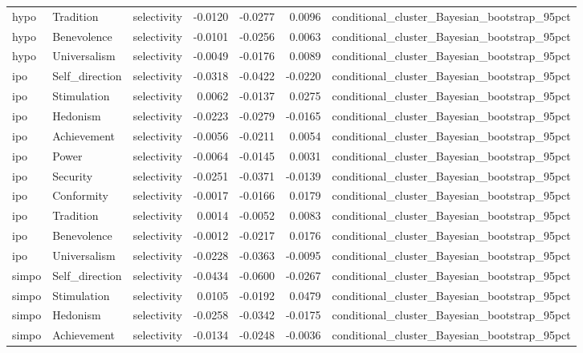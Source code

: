 \begin{tabular}{lllrrrl}
hypo & Tradition & selectivity & -0.0120 & -0.0277 & 0.0096 & conditional\_cluster\_Bayesian\_bootstrap\_95pct \\
hypo & Benevolence & selectivity & -0.0101 & -0.0256 & 0.0063 & conditional\_cluster\_Bayesian\_bootstrap\_95pct \\
hypo & Universalism & selectivity & -0.0049 & -0.0176 & 0.0089 & conditional\_cluster\_Bayesian\_bootstrap\_95pct \\
ipo & Self\_direction & selectivity & -0.0318 & -0.0422 & -0.0220 & conditional\_cluster\_Bayesian\_bootstrap\_95pct \\
ipo & Stimulation & selectivity & 0.0062 & -0.0137 & 0.0275 & conditional\_cluster\_Bayesian\_bootstrap\_95pct \\
ipo & Hedonism & selectivity & -0.0223 & -0.0279 & -0.0165 & conditional\_cluster\_Bayesian\_bootstrap\_95pct \\
ipo & Achievement & selectivity & -0.0056 & -0.0211 & 0.0054 & conditional\_cluster\_Bayesian\_bootstrap\_95pct \\
ipo & Power & selectivity & -0.0064 & -0.0145 & 0.0031 & conditional\_cluster\_Bayesian\_bootstrap\_95pct \\
ipo & Security & selectivity & -0.0251 & -0.0371 & -0.0139 & conditional\_cluster\_Bayesian\_bootstrap\_95pct \\
ipo & Conformity & selectivity & -0.0017 & -0.0166 & 0.0179 & conditional\_cluster\_Bayesian\_bootstrap\_95pct \\
ipo & Tradition & selectivity & 0.0014 & -0.0052 & 0.0083 & conditional\_cluster\_Bayesian\_bootstrap\_95pct \\
ipo & Benevolence & selectivity & -0.0012 & -0.0217 & 0.0176 & conditional\_cluster\_Bayesian\_bootstrap\_95pct \\
ipo & Universalism & selectivity & -0.0228 & -0.0363 & -0.0095 & conditional\_cluster\_Bayesian\_bootstrap\_95pct \\
simpo & Self\_direction & selectivity & -0.0434 & -0.0600 & -0.0267 & conditional\_cluster\_Bayesian\_bootstrap\_95pct \\
simpo & Stimulation & selectivity & 0.0105 & -0.0192 & 0.0479 & conditional\_cluster\_Bayesian\_bootstrap\_95pct \\
simpo & Hedonism & selectivity & -0.0258 & -0.0342 & -0.0175 & conditional\_cluster\_Bayesian\_bootstrap\_95pct \\
simpo & Achievement & selectivity & -0.0134 & -0.0248 & -0.0036 & conditional\_cluster\_Bayesian\_bootstrap\_95pct \\

\end{tabular}
